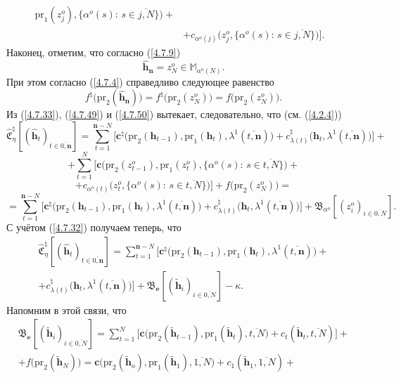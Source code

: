 \documentclass[11pt,twoside]{report}
\newcommand{\bfn}{\begin{equation}}
\newcommand{\efn}{\end{equation}}
\newcommand{\ov}{\overline}
\newcommand{\la}{\lambda}
\newcommand{\al}{\alpha}
\newcommand{\zc}{{\mathbf c}}
\newcommand{\nn}{{\mathbf n}}
\begin{document}
{{\begin{eqnarray}
\mathrm{pr}_1(z_j^o),\{\al^o(s):\,s\in \ov{j,N}\}\bigl) +
&\nonumber\\
&+c_{\al^o(j)}\bigl(z_j^o,\{\al^o(s):\,s\in \ov{j,N}\}\bigl)\bigl].
&\label{4.7.49}
\end{eqnarray}
Наконец, отметим, что согласно (\ref{4.7.9})
$$
\hat{\mathbf{h}}_\nn = z_N^o\in \mathbb{M}_{\al^o(N)}.
$$
При этом согласно (\ref{4.7.4}) справедливо следующее равенство
\bfn\label{4.7.50}f^\natural\bigl(\mathrm{pr}_2(\hat{\mathbf{h}}_\nn)\bigl) =
f^\natural\bigl(\mathrm{pr}_2(z_N^o)\bigl) = f\bigl(\mathrm{pr}_2(z_N^o)\bigl).
\efn
Из (\ref{4.7.33}), (\ref{4.7.49}) и (\ref{4.7.50}) вытекает, следовательно, что (см. (\ref{4.2.4}))
$$
\widehat{\mathfrak{C}}_\eta^\natural[(\hat{\mathbf{h}}_t)_{t\in\ov{0,\nn}}] =
\sum\limits_{t=1}^{\nn-N}\bigl[\zc^\natural\bigl(\mathrm{pr}_2(\mathbf{h}_{t-1}),\mathrm{pr}_1
(\mathbf{h}_t),\la^1(\ov{t,\nn})\bigl) + c_{\la(t)}^\natural\bigl(\mathbf{h}_t,
\la^1(\ov{t,\nn})\bigl)\bigl]+
$$
$$+\sum\limits_{t=1}^N \bigl[\zc\bigl(\mathrm{pr}_2(z_{t-1}^o),
\mathrm{pr}_1(z_t^o),\{\al^o(s):\,s\in \ov{t,N}\}\bigl) +
$$
$$
+c_{\al^o(t)}\bigl(z_t^o,\{\al^o(s):\,
s\in \ov{t,N}\}\bigl)\bigl]+ f\bigl(\mathrm{pr}_2(z_N^o)\bigl) =
$$
$$=\sum\limits_{t=1}^{\nn-N}
\bigl[\zc^\natural\bigl(\mathrm{pr}_2(\mathbf{h}_{t-1}),\mathrm{pr}_1
(\mathbf{h}_t),\la^1(\ov{t,\nn})\bigl)+ c_{\la(t)}^\natural\bigl(\mathbf{h}_t,\la^1(\ov{t,\nn})
\bigl)\bigl] + \mathfrak{B}_{\al^o}[(z_i^o)_{i\in\ov{0,N}}].
$$
С учётом (\ref{4.7.32}) получаем теперь, что
\begin{eqnarray}
&\widehat{\mathfrak{C}}_\eta^\natural[(\hat{\mathbf{h}}_t)_{t\in\ov{0,\nn}}] =
\sum\limits_{t=1}^{\nn-N}\bigl[\zc^\natural\bigl(\mathrm{pr}_2(\mathbf{h}_{t-1}),\mathrm{pr}_1
(\mathbf{h}_t),\la^1(\ov{t,\nn})\bigl) +
&\nonumber\\
&+ c_{\la(t)}^\natural\bigl(\mathbf{h}_t,\la^1(\ov{t,\nn})\bigl)\bigl]+
\mathfrak{B}_\mathbf{e}[(\tilde{\mathbf{h}}_i)_{i\in\ov{0,N}}]-\kappa.
&\label{4.7.51}
\end{eqnarray}
 Напомним в этой связи, что
\begin{eqnarray}
&\mathfrak{B}_\mathbf{e}[(\tilde{\mathbf{h}}_i)_{i\in\ov{0,N}}] =
\sum\limits_{t=1}^N\bigl[\zc\bigl(\mathrm{pr}_2(\tilde{\mathbf{h}}_{t-1}),\mathrm{pr}_1
(\tilde{\mathbf{h}}_t),\ov{t,N}) + c_t(\tilde{\mathbf{h}}_t,\ov{t,N})\bigl]+
&\nonumber\\
&+f\bigl(\mathrm{pr}_2(\tilde{\mathbf{h}}_N)\bigl) =
\zc\bigl(\mathrm{pr}_2(\tilde{\mathbf{h}}_o),\mathrm{pr}_1
(\tilde{\mathbf{h}}_1),\ov{1,N}) +c_1(\tilde{\mathbf{h}}_1,\ov{1,N}) +

\end{eqnarray}}}
\end{document}
